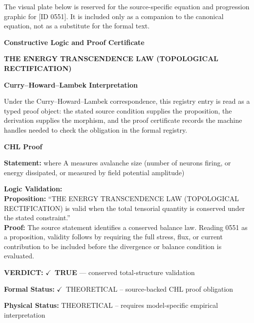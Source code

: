 \begingroup\footnotesize\sloppy
The visual plate below is reserved for the source-specific equation and progression graphic for [ID 0551]. It is included only as a companion to the canonical equation, not as a substitute for the formal text.
\par\endgroup
\ifTZPDarkEdition
{}
\fi

\clearpage
\begingroup\tzpsupportsetup
\noindent\textbf{\fontsize{10.8pt}{12.8pt}\selectfont [ID 0551] Constructive Logic and Proof Certificate}\par
\noindent\textbf{\fontsize{10pt}{12pt}\selectfont THE ENERGY TRANSCENDENCE LAW (TOPOLOGICAL RECTIFICATION)}\par
\vspace{0.45em}
\begingroup
\footnotesize
\setlength{\parskip}{0.22em}
\setlength{\parindent}{0pt}
\noindent\textbf{Curry--Howard--Lambek Interpretation}\par
Under the Curry--Howard--Lambek correspondence, this registry entry is read as a typed proof
object: the stated source condition supplies the proposition, the derivation supplies the
morphism, and the proof certificate records the machine handles needed to check the obligation
in the formal registry.

\vspace{0.45em}
\noindent\textbf{CHL Proof}\par
\textbf{Statement:} where A measures avalanche size (number of neurons firing, or energy dissipated, or
measured by field potential amplitude)

\textbf{Logic Validation:}\\
\textbf{Proposition:} ``THE ENERGY TRANSCENDENCE LAW (TOPOLOGICAL RECTIFICATION) is valid when the total
tensorial quantity is conserved under the stated constraint.''\\
\textbf{Proof:} The source statement identifies a conserved balance law. Reading 0551 as a proposition,
validity follows by requiring the full stress, flux, or current contribution to be
included before the divergence or balance condition is evaluated.

\textbf{VERDICT:} \ensuremath{\checkmark}\ \textbf{TRUE} --- conserved total-structure validation

\textbf{Formal Status:} \ensuremath{\checkmark}\ THEORETICAL -- source-backed CHL proof obligation

\textbf{Physical Status:} THEORETICAL -- requires model-specific empirical interpretation
\par\vspace{0.45em}
\par
\ifTZPDarkEdition
{}
\fi
\endgroup
\endgroup
